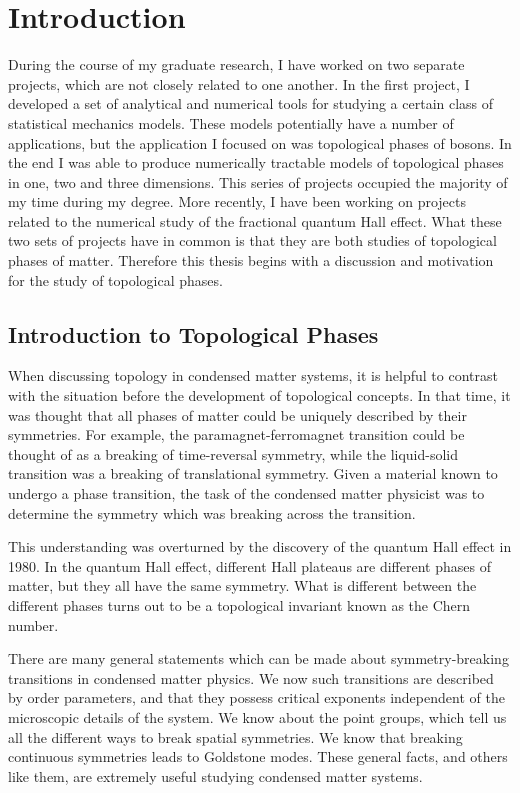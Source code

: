 \chapter{Introduction}

During the course of my graduate research, I have worked on two separate projects, which are not closely related to one another. In the first project, I developed a set of analytical and numerical tools for studying a certain class of statistical mechanics models. These models potentially have a number of applications, but the application I focused on was topological phases of bosons. In the end I was able to produce numerically tractable models of topological phases in one, two and three dimensions. This series of projects occupied the majority of my time during my degree. 
More recently, I have been working on projects related to the numerical study of the fractional quantum Hall effect. What these two sets of projects have in common is that they are both studies of topological phases of matter. Therefore this thesis begins with a discussion and motivation for the study of topological phases.

\section{Introduction to Topological Phases}

When discussing topology in condensed matter systems, it is helpful to contrast with the situation before the development of topological concepts. In that time, it was thought that all phases of matter could be uniquely described by their symmetries. For example, the paramagnet-ferromagnet transition could be thought of as a breaking of time-reversal symmetry, while the liquid-solid transition was a breaking of translational symmetry. Given a material known to undergo a phase transition, the task of the condensed matter physicist was to determine the symmetry which was breaking across the transition.

This understanding was overturned by the discovery of the quantum Hall effect in 1980.\cite{vonKlitzing} In the quantum Hall effect, different Hall plateaus are different phases of matter, but they all have the same symmetry. What is different between the different phases turns out to be a topological invariant known as the Chern number. 

There are many general statements which can be made about symmetry-breaking transitions in condensed matter physics. We now such transitions are described by order parameters, and that they possess critical exponents independent of the microscopic details of the system. We know about the point groups, which tell us all the different ways to break spatial symmetries. We know that breaking continuous symmetries leads to Goldstone modes. These general facts, and others like them, are extremely useful studying condensed matter systems. 

